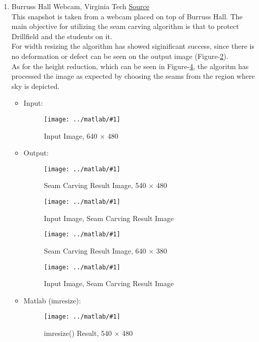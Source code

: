 \documentclass{article}
\newcommand{\listFigure}[3]{ \begin{figure}[H]
\texttt{[image: ../matlab/\#1]}
		\caption{#2\label{fig:#3}}
	\end{figure}		
}
\begin{document}
\begin{enumerate}
\begin{enumerate}
		\item Burruss Hall Webcam, Virginia Tech
		\href{https://www.vtnews.vt.edu/webcams/burruss.html}{Source} \\ This snapshot
		is taken from a webcam placed on top of Burruss Hall. The main objective for
		utilizing the seam carving algorithm is that to protect Drillfield and the
		students on it. \\
		For width resizing the algorithm has showed siginificant success, since there
		is no deformation or defect can be seen on the output image
		(Figure-\ref{fig:outputBurrussHallW}). \\
		As for the height reduction, which can be seen in
		Figure-\ref{fig:outputBurrussHallH}, the algoritm has processed the image as
		expected by choosing the seams from the region where sky is depicted.
		\begin{itemize}
			\item Input: 
			\listFigure{BurrussHall/inputBurrussHall.jpg}{Input Image, 640 $\times$
			480}{inputBurrussHall}
			\item Output:
			\listFigure{BurrussHall/outputBurrussHallW.png}{Seam Carving Result Image,
			540 $\times$ 480}{outputBurrussHallW} 
			\listFigure{BurrussHall/outputIOW.png}{Input Image, Seam Carving
			Result Image}{outputBurrussHallIOW}
			\listFigure{BurrussHall/outputBurrussHallH.png}{Seam Carving Result Image,
			640 $\times$ 380}{outputBurrussHallH} 
			\listFigure{BurrussHall/outputIOH.png}{Input Image, Seam Carving
			Result Image}{outputBurrussHallIOH}
			\item Matlab (imresize): 
			\listFigure{BurrussHall/outputBurrussHallMatlab.png}{imresize() Result, 540
			$\times$ 480}{outputBurrussHallMatlab}
		\end{itemize}
	\end{enumerate}
\end{enumerate}
\pagebreak

\label{Extra Credit}
\end{document}
